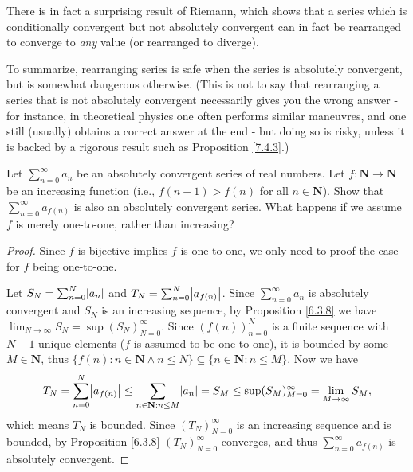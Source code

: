 \begin{note}
    There is in fact a surprising result of Riemann, which shows that a series which is conditionally convergent but not absolutely convergent can in fact be rearranged to converge to \emph{any} value
    (or rearranged to diverge).
\end{note}

\begin{note}
    To summarize, rearranging series is safe when the series is absolutely convergent, but is somewhat dangerous otherwise.
    (This is not to say that rearranging a series that is not absolutely convergent necessarily gives you the wrong answer
    - for instance, in theoretical physics one often performs similar maneuvres, and one still (usually) obtains a correct answer at the end
    - but doing so is risky, unless it is backed by a rigorous result such as Proposition \ref{7.4.3}.)
\end{note}

\exercisesection

\begin{exercise}\label{ex 7.4.1}
    Let \(\sum_{n = 0}^\infty a_n\) be an absolutely convergent series of real numbers.
    Let \(f : \mathbf{N} \to \mathbf{N}\) be an increasing function (i.e., \(f(n + 1) > f(n)\) for all \(n \in \mathbf{N}\)).
    Show that \(\sum_{n = 0}^\infty a_{f(n)}\) is also an absolutely convergent series.
    What happens if we assume \(f\) is merely one-to-one, rather than increasing?
\end{exercise}

\begin{proof}
    Since \(f\) is bijective implies \(f\) is one-to-one, we only need to proof the case for \(f\) being one-to-one.

    Let \(S_N = \sum_{n = 0}^N \abs*{a_n}\) and \(T_N = \sum_{n = 0}^N \abs*{a_{f(n)}}\).
    Since \(\sum_{n = 0}^\infty a_n\) is absolutely convergent and \(S_N\) is an increasing sequence, by Proposition \ref{6.3.8} we have \(\lim_{N \to \infty} S_N = \sup(S_N)_{N = 0}^\infty\).
    Since \((f(n))_{n = 0}^N\) is a finite sequence with \(N + 1\) unique elements (\(f\) is assumed to be one-to-one), it is bounded by some \(M \in \mathbf{N}\), thus \(\{f(n) : n \in \mathbf{N} \land n \leq N\} \subseteq \{n \in \mathbf{N} : n \leq M\}\).
    Now we have
    \[
        T_N = \sum_{n = 0}^N \abs*{a_{f(n)}} \leq \sum_{n \in \mathbf{N} : n \leq M} \abs*{a_n} = S_M \leq \sup(S_M)_{M = 0}^\infty = \lim_{M \to \infty} S_M,
    \]
    which means \(T_N\) is bounded.
    Since \((T_N)_{N = 0}^\infty\) is an increasing sequence and is bounded, by Proposition \ref{6.3.8} \((T_N)_{N = 0}^\infty\) converges, and thus \(\sum_{n = 0}^\infty a_{f(n)}\) is absolutely convergent.
\end{proof}
